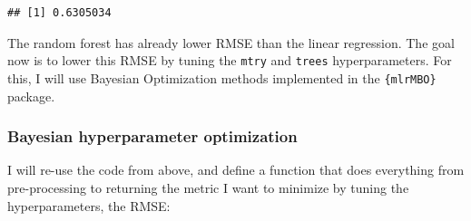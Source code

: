 \documentclass[
]{article}
\newenvironment{Shaded}{\begin{snugshade}}{\end{snugshade}}
\newcommand{\AttributeTok}[1]{\textcolor[rgb]{0.77,0.63,0.00}{#1}}
\newcommand{\ControlFlowTok}[1]{\textcolor[rgb]{0.13,0.29,0.53}{\textbf{#1}}}
\newcommand{\DecValTok}[1]{\textcolor[rgb]{0.00,0.00,0.81}{#1}}
\newcommand{\FunctionTok}[1]{\textcolor[rgb]{0.00,0.00,0.00}{#1}}
\newcommand{\NormalTok}[1]{#1}
\newcommand{\OtherTok}[1]{\textcolor[rgb]{0.56,0.35,0.01}{#1}}
\newcommand{\SpecialCharTok}[1]{\textcolor[rgb]{0.00,0.00,0.00}{#1}}
\begin{document}
\begin{verbatim}
## [1] 0.6305034
\end{verbatim}

The random forest has already lower RMSE than the linear regression. The goal now is to lower this
RMSE by tuning the \texttt{mtry} and \texttt{trees} hyperparameters. For this, I will use Bayesian Optimization
methods implemented in the \texttt{\{mlrMBO\}} package.

\hypertarget{bayesian-hyperparameter-optimization}{%
\subsubsection{Bayesian hyperparameter optimization}\label{bayesian-hyperparameter-optimization}}

I will re-use the code from above, and define a function that does everything from pre-processing
to returning the metric I want to minimize by tuning the hyperparameters, the RMSE:

\begin{Shaded}
\end{Shaded}
\end{document}
